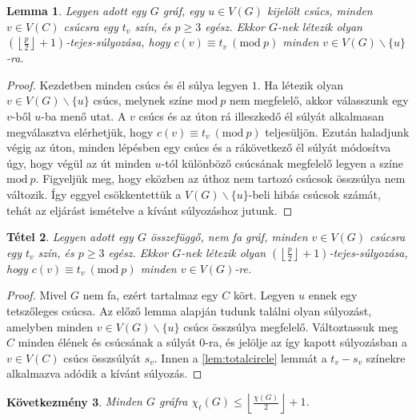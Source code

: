 \documentclass[12pt, a4paper]{report}
\newtheorem{tét}{Tétel}[section]
\newtheorem{lem}[tét]{Lemma}
\newtheorem{köv}[tét]{Következmény}
\theoremstyle{remark}
\theoremstyle{definition}
\begin{document}
\begin{lem}
Legyen adott egy $G$ gráf, egy $u \in V(G)$ kijelölt csúcs, minden $v \in V(C)$ csúcsra egy $t_v$ szín, és $p \geq 3$ egész. Ekkor $G$-nek létezik olyan $\left( \left\lfloor \frac{p}{2} \right\rfloor + 1 \right)$-tejes-súlyozása, hogy $c(v) ≡ t_v\ (\mathrm{mod}\ p)$ minden $v \in V(G) \smallsetminus \lbrace u \rbrace$-ra.
\end{lem}

\begin{proof}
Kezdetben minden csúcs és él súlya legyen $1$. Ha létezik olyan $v \in V(G) \smallsetminus \lbrace u \rbrace$ csúcs, melynek színe $\mathrm{mod}\ p$ nem megfelelő, akkor válasszunk egy $v$-ből $u$-ba menő utat. A $v$ csúcs és az úton rá illeszkedő él súlyát alkalmasan megválasztva elérhetjük, hogy $c(v) ≡ t_v\ (\mathrm{mod}\ p)$ teljesüljön. Ezután haladjunk végig az úton, minden lépésben egy csúcs és a rákövetkező él súlyát módosítva úgy, hogy végül az út minden $u$-tól különböző csúcsának megfelelő legyen a színe $\mathrm{mod}\ p$. Figyeljük meg, hogy eközben az úthoz nem tartozó csúcsok összsúlya nem változik. Így eggyel csökkentettük a $V(G) \smallsetminus \lbrace u \rbrace$-beli hibás csúcsok számát, tehát az eljárást ismételve a kívánt súlyozáshoz jutunk.
\end{proof}

\begin{tét}
Legyen adott egy $G$ összefüggő, nem fa gráf, minden $v \in V(G)$ csúcsra egy $t_v$ szín, és $p \geq 3$ egész. Ekkor $G$-nek létezik olyan $\left( \left\lfloor \frac{p}{2} \right\rfloor + 1 \right)$-tejes-súlyozása, hogy $c(v) ≡ t_v\ (\mathrm{mod}\ p)$ minden $v \in V(G)$-re.
\end{tét}

\begin{proof}
Mivel $G$ nem fa, ezért tartalmaz egy $C$ kört. Legyen $u$ ennek egy tetszőleges csúcsa. Az előző lemma alapján tudunk találni olyan súlyozást, amelyben minden $v \in V(G) \smallsetminus \lbrace u \rbrace$ csúcs összsúlya megfelelő. Változtassuk meg $C$ minden élének és csúcsának a súlyát $0$-ra, és jelölje az így kapott súlyozásban a $v \in V(C)$ csúcs összsúlyát $s_v$. Innen a \ref{lem:totalcircle} lemmát a $t_v - s_v$ színekre alkalmazva adódik a kívánt súlyozás.
\end{proof}

\begin{köv} \label{cor:totalchromatic}
Minden $G$ gráfra $\chi_t(G) \leq \left\lfloor \frac{\chi(G)}{2} \right\rfloor + 1$.
\end{köv}
\end{document}
